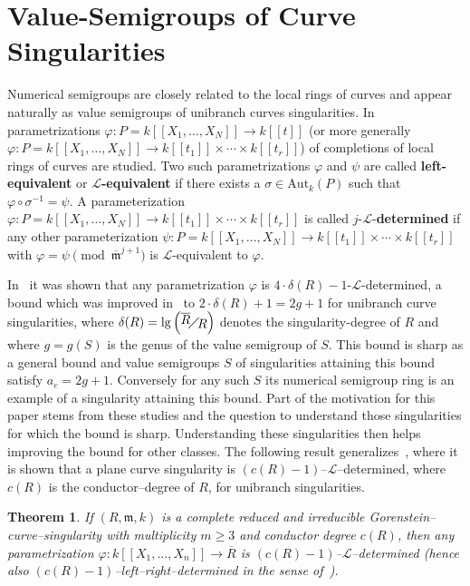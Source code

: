 \documentclass[a4paper,12pt,scrbook]{amsart}
\newcommand*{\faktor}[2]{%
  \raisebox{0.2\height}{\ensuremath{#1}}%
  \mkern-3mu\diagup\mkern-3mu%
  \raisebox{-0.2\height}{\ensuremath{#2}}%
}
\theoremstyle{plain}%
\newtheorem{satz}{Theorem}[section]
\theoremstyle{definition}
\begin{document}
\section{Value-Semigroups of Curve Singularities}

Numerical semigroups are closely related to the local rings  
of curves and appear naturally as value semigroups 
of unibranch curves singularities. In~\cite{GP} parametrizations 
$\varphi: P = k[[X_1, \ldots, X_N]] \longrightarrow k[[t]]$ 
(or more generally $\varphi: P = k[[X_1, \ldots, X_N]] 
\longrightarrow k[[t_1]]\times \cdots \times k[[t_r]]$) of  
completions of local rings of curves are studied.  
Two such parametrizations 
$\varphi$ and $\psi$ are called  \textbf{left-equivalent} or 
$\mathbf{\mathcal{L}}$\textbf{-equivalent} if there
exists a $\sigma \in \mathrm{Aut}_k(P)$ such
that $\varphi \circ \sigma^{-1} = \psi$.
A parameterization $\varphi : P = k[[X_1, \ldots, X_N]] 
\longrightarrow  k[[t_1]]\times \cdots \times k[[t_r]]$ is called 
$j$-$\mathcal{L}$-\textbf{determined}
if any other parameterization $\psi : P = k[[X_1, \ldots, X_N]] 
\longrightarrow  k[[t_1]]\times \cdots \times k[[t_r]]$
with $\varphi = \psi \pmod{\overline{\mathfrak m}^{j+1}}$
is $\mathcal{L}$-equivalent to $\varphi$. 

In~\cite[Corollary 12]{GP} it was shown that any parametrization 
$\varphi$ is $4 \cdot \delta(R)-1$-$\mathcal{L}$-determined, 
a bound which was improved in~\cite[Corollary 3.3]{HS}  to 
$2 \cdot \delta(R) + 1 = 2g+1$ for unibranch curve 
singularities, where 
$\delta(R) = \operatorname{lg}\left(\faktor{\overline{R}}{R}\right)$ 
denotes the singularity-degree of $R$ and where $g = g(S)$ 
is the genus of the value semigroup of $S$. This bound is sharp 
as a general bound and value semigroups $S$ of singularities 
attaining this bound satisfy $a_e =2g+1$. Conversely for any 
such $S$ its numerical semigroup ring is an example of a 
singularity attaining this bound. Part of the motivation for 
this paper stems from these studies and the question to 
understand those singularities for which the bound is sharp. 
Understanding these singularities then helps improving the 
bound for other classes. The following result 
generalizes~\cite[Theorem 2.1]{Ng20}, where it is 
shown that a plane curve singularity is 
$(c(R){-}1)$--$\mathcal{L}$--determined, where $c(R)$ is 
the conductor--degree of $R$, for unibranch singularities. 

\begin{satz}\label{cor:gorenstein_det}
If $(R, \mathfrak m, k)$ is a complete reduced and irreducible 
Gorenstein--curve--singularity with multiplicity $m \geq 3$ and 
conductor degree $c(R)$, then any parametrization 
$\varphi: k[[X_1, \ldots, X_n]]\longrightarrow \overline{R}$ is  
$(c(R){-}1)$--$\mathcal{L}$--determined (hence also 
$(c(R){-}1)$--left--right--determined in the sense of~\cite{GP}). 
\end{satz}
\end{document}
